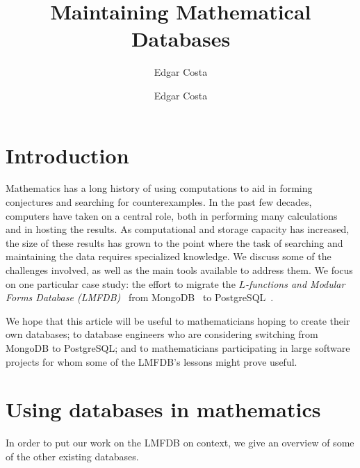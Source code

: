 \documentclass{amsart}
\begin{document}
\title{Maintaining Mathematical Databases}

\author{Edgar Costa}
\address{Department of Mathematics, Massachusetts Institute of Technology, Cambridge, MA 02139, USA}
\author{Edgar Costa}
\address{Department of Mathematics, Massachusetts Institute of Technology, Cambridge, MA 02139, USA}

\begin{abstract}

\end{abstract}

\maketitle

\section{Introduction}

Mathematics has a long history of using computations to aid in forming conjectures and searching for counterexamples.
In the past few decades, computers have taken on a central role, both in performing many calculations and in hosting the results.
As computational and storage capacity has increased, the size of these results has grown to the point where the task of searching and maintaining the data requires specialized knowledge.
We discuss some of the challenges involved, as well as the main tools available to address them.
We focus on one particular case study: the effort to migrate the \emph{$L$-functions and Modular Forms Database (LMFDB)}~\cite{lmfdb} from MongoDB~\cite{mongo} to PostgreSQL~\cite{postgres}.


We hope that this article will be useful to mathematicians hoping to create their own databases; to database engineers who are considering switching from MongoDB to PostgreSQL; and to mathematicians participating in large software projects for whom some of the LMFDB's lessons might prove useful.

\section{Using databases in mathematics}

In order to put our work on the LMFDB on context, we give an overview of some of the other existing databases.
\end{document}
